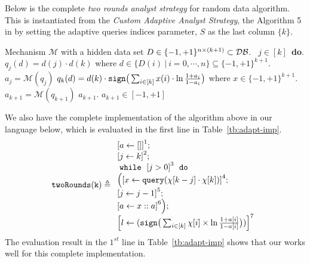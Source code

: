 
\begin{example}
    \label{ex:twoRoundsComplete}

Below is the complete \emph{two rounds analyst strategy} for random data algorithm. This is instantiated from the
\emph{Custom Adaptive Analyst Strategy}, the Algorithm 5 in \cite{RogersRSSTW20} by setting the adaptive queries indices parameter, $S$ as the last column $\{ k \}$.

\begin{algorithm}
    \caption{The complete \emph{two rounds analyst strategy} for random data}
    \label{alg:twoRound}
    \begin{algorithmic}
    \REQUIRE Mechanism $\mathcal{M}$ with a hidden data set $D \in \{-1,+1\}^{n\times (k+1)} \subset \mathcal{DB}$.
    \ $j\in [k]$\ {\bf do}.  
    \STATE {} $q_j(d)=d(j)\cdot d(k)$ where $d \in \{D(i) ~|~ i = 0, \cdots, n\} \subseteq \{-1,+1\}^{k+1}$.
    \STATE {} $a_j=\mathcal{M}(q_j)$ 
    \STATE \qquad {}
     $q_{k}(d)= d(k) \cdot \mathtt{sign}\big (\sum_{i\in [k]} x(i) \cdot \ln\frac{1+a_i}{1-a_i} \big )$ where $x\in \{-1,+1\}^{k+1}$.
    \STATE{}
     $a_{k+1}=\mathcal{M}(q_{k+1})$
    \STATE{}
    \RETURN $a_{k+1}$.
    \ENSURE $a_{k+1}\in [-1,+1]$
    \end{algorithmic}
    \end{algorithm}
%
We also have the complete implementation of the algorithm above in our language below, which is evaluated in the first line in Table~\ref{tb:adapt-imp}.
\[
    \kw{twoRounds(k)} \triangleq
\begin{array}{l}
       \clabel{ a \leftarrow []}^{1} ; \\
        \clabel{\assign{j}{k} }^{2} ; \\
        \ewhile ~ \clabel{j > 0}^{3} ~ \edo ~ \\
        \Big(
         \clabel{\assign{x}{\query(\chi[k - j]\cdot \chi[k])} }^{4}  ; \\
         \clabel{\assign{j}{j-1}}^{5} ;\\
        \clabel{a \leftarrow x :: a}^{6}       \Big);\\
        \clabel{l \leftarrow (\kw{sign}\big (\sum_{i\in [k]} \chi[i]\times\ln\frac{1+a[i]}{1-a[i]} \big ))}^{7}\\
    \end{array}
\]
%
The evaluation result in the $1^{st}$ line in Table~\ref{tb:adapt-imp} shows that our {\THESYSTEM} works well for this complete implementation.
    \end{example}